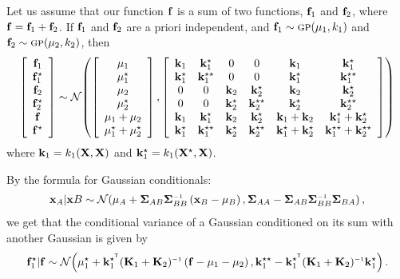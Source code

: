 \documentclass[twoside]{article}
\begin{document}
Let us assume that our function ${\bf{f}}$ is a sum of two functions, ${\bf{f}}_1$ and ${\bf{f}}_2$, where ${\bf{f}} = {\bf{f}}_1 + {\bf{f}}_2$.  If ${\bf{f}}_1$ and ${\bf{f}}_2$ are a priori independent, and ${\bf{f}}_1 \sim {\textsc{gp}}( {\bf{\mu}}_1, k_1)$ and ${\bf{f}}_2 \sim {\textsc{gp}}( {\bf{\mu}}_2, k_2)$, then
\begin{align}
\left[ \begin{array}{c} {\bf{f}}_1 \\ {\bf{f}}_1^\star \\ {\bf{f}}_2 \\ {\bf{f}}_2^\star \\ {\bf{f}} \\ {\bf{f}}^\star \end{array} \right]
\sim
\mathcal{N}\!\left(\left[ \begin{array}{c} {\bf{\mu}}_1 \\ {\bf{\mu}}_1^\star \\ {\bf{\mu}}_2 \\ {\bf{\mu}}_2^\star \\ {\bf{\mu}}_1 + {\bf{\mu}}_2 \\ {\bf{\mu}}_1^\star + {\bf{\mu}}_2^\star \end{array} \right]
,\left[ \begin{array}{cccccc} 
{\bf{k}}_1 & {\bf{k}}_1^\star & 0 & 0 & {\bf{k}}_1 & {\bf{k}}_1^\star \\ 
{\bf{k}}_1^\star & {\bf{k}}_1^{\star\star} & 0 & 0 & {\bf{k}}_1^\star & {\bf{k}}_1^{\star\star} \\
0 & 0 & {\bf{k}}_2 & {\bf{k}}_2^\star & {\bf{k}}_2 & {\bf{k}}_2^\star \\ 
0 & 0 & {\bf{k}}_2^\star & {\bf{k}}_2^{\star\star} & {\bf{k}}_2^\star & {\bf{k}}_2^{\star\star} \\
{\bf{k}}_1 & {\bf{k}}_1^\star & {\bf{k}}_2 & {\bf{k}}_2^\star & {\bf{k}}_1 + {\bf{k}}_2 & {\bf{k}}_1^\star + {\bf{k}}_2^\star \\ 
{\bf{k}}_1^\star & {\bf{k}}_1^{\star\star}  & {\bf{k}}_2^\star & {\bf{k}}_2^{\star\star}  & {\bf{k}}_1^\star + {\bf{k}}_2^\star & {\bf{k}}_1^{\star\star} + {\bf{k}}_2^{\star\star}\\
\end{array} \right]
\right)
\end{align}
where ${\bf{k}}_1 = k_1( \mathbf{X}, \mathbf{X} )$ and ${\bf{k}}_1^\star = k_1( \mathbf{X}^\star, \mathbf{X} )$. 

By the formula for Gaussian conditionals:
\begin{align}
\vx_A | \vx B \sim \Nt{\vmu_A + \vSigma_{AB} \vSigma_{BB}\inv \left( \vx_B - \vmu_B \right) }
{\vSigma_{AA} - \vSigma_{AB} \vSigma_{BB}\inv \vSigma_{BA} },
\end{align}
we get that the conditional variance of a Gaussian conditioned on its sum with another Gaussian is given by
\begin{align}
\vf_1^\star | \vf \sim \Nt{\vmu_1^\star + \vk_1^{\star\tra} (\vK_1 + \vK_2)\inv \left( \vf - \vmu_1 - \vmu_2 \right) }
{\vk_1^{\star\star} - \vk_1^{\star\tra} (\vK_1 + \vK_2)\inv \vk_1^\star }.
\end{align}
\end{document}
